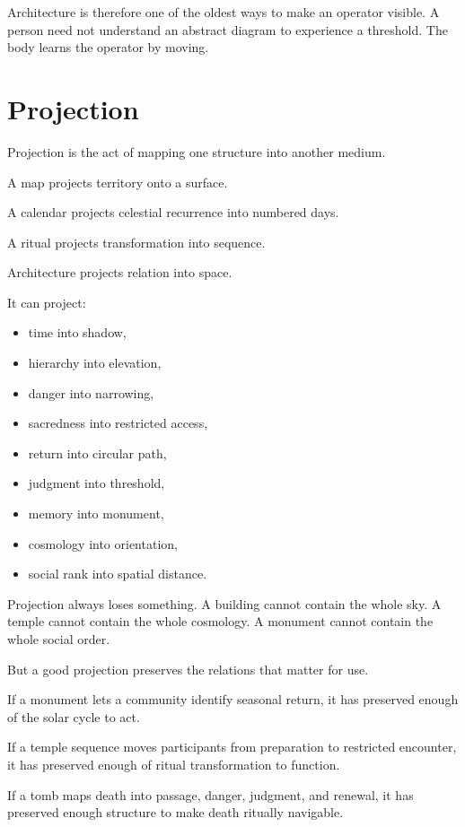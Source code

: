 \documentclass[11pt]{book}
\begin{document}
Architecture is therefore one of the oldest ways to make an operator visible. A person need not understand an abstract diagram to experience a threshold. The body learns the operator by moving.

\section{Projection}

Projection is the act of mapping one structure into another medium.

A map projects territory onto a surface.

A calendar projects celestial recurrence into numbered days.

A ritual projects transformation into sequence.

Architecture projects relation into space.

It can project:

\begin{itemize}
    \item time into shadow,
    \item hierarchy into elevation,
    \item danger into narrowing,
    \item sacredness into restricted access,
    \item return into circular path,
    \item judgment into threshold,
    \item memory into monument,
    \item cosmology into orientation,
    \item social rank into spatial distance.
\end{itemize}

Projection always loses something. A building cannot contain the whole sky. A temple cannot contain the whole cosmology. A monument cannot contain the whole social order.

But a good projection preserves the relations that matter for use.

If a monument lets a community identify seasonal return, it has preserved enough of the solar cycle to act.

If a temple sequence moves participants from preparation to restricted encounter, it has preserved enough of ritual transformation to function.

If a tomb maps death into passage, danger, judgment, and renewal, it has preserved enough structure to make death ritually navigable.
\end{document}
